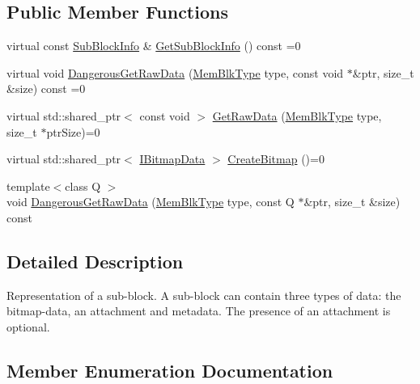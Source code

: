 \subsection*{Public Member Functions}
\begin{DoxyCompactItemize}
\item 
virtual const \hyperlink{structlib_c_z_i_1_1_sub_block_info}{Sub\+Block\+Info} \& \hyperlink{classlib_c_z_i_1_1_i_sub_block_a557108549db08e25b1df1ef8fae37a07}{Get\+Sub\+Block\+Info} () const =0
\item 
virtual void \hyperlink{classlib_c_z_i_1_1_i_sub_block_a6f84a58437af59bac64a6147369ddae4}{Dangerous\+Get\+Raw\+Data} (\hyperlink{classlib_c_z_i_1_1_i_sub_block_a4dc4926ea65d8d20310b8b79ea76e108}{Mem\+Blk\+Type} type, const void $\ast$\&ptr, size\+\_\+t \&size) const =0
\item 
virtual std\+::shared\+\_\+ptr$<$ const void $>$ \hyperlink{classlib_c_z_i_1_1_i_sub_block_a55ec2c117050df253367661f9cd606cf}{Get\+Raw\+Data} (\hyperlink{classlib_c_z_i_1_1_i_sub_block_a4dc4926ea65d8d20310b8b79ea76e108}{Mem\+Blk\+Type} type, size\+\_\+t $\ast$ptr\+Size)=0
\item 
virtual std\+::shared\+\_\+ptr$<$ \hyperlink{classlib_c_z_i_1_1_i_bitmap_data}{I\+Bitmap\+Data} $>$ \hyperlink{classlib_c_z_i_1_1_i_sub_block_af2059d1f270f3e4349244403fa7dd71c}{Create\+Bitmap} ()=0
\item 
{\footnotesize template$<$class Q $>$ }\\void \hyperlink{classlib_c_z_i_1_1_i_sub_block_acd9396cc5d366de99b37a26c98031d66}{Dangerous\+Get\+Raw\+Data} (\hyperlink{classlib_c_z_i_1_1_i_sub_block_a4dc4926ea65d8d20310b8b79ea76e108}{Mem\+Blk\+Type} type, const Q $\ast$\&ptr, size\+\_\+t \&size) const
\end{DoxyCompactItemize}


\subsection{Detailed Description}
Representation of a sub-\/block. A sub-\/block can contain three types of data\+: the bitmap-\/data, an attachment and metadata. The presence of an attachment is optional. 

\subsection{Member Enumeration Documentation}
\mbox{\label{classlib_c_z_i_1_1_i_sub_block_a4dc4926ea65d8d20310b8b79ea76e108}} 
